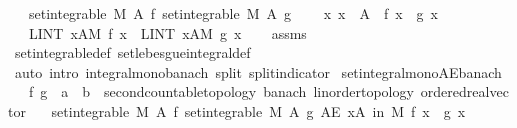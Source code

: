 \begin{isabellebody}
\ \ \ {\isachardoublequoteopen}set{\isacharunderscore}{\kern0pt}integrable\ M\ A\ f{\isachardoublequoteclose}\ {\isachardoublequoteopen}set{\isacharunderscore}{\kern0pt}integrable\ M\ A\ g{\isachardoublequoteclose}\isanewline
\ \ \ \ {\isachardoublequoteopen}{\isasymAnd}x{\isachardot}{\kern0pt}\ x\ {\isasymin}\ A\ {\isasymLongrightarrow}\ f\ x\ {\isasymle}\ g\ x{\isachardoublequoteclose}\isanewline
\ \ \ {\isachardoublequoteopen}{\isacharparenleft}{\kern0pt}LINT\ x{\isacharcolon}{\kern0pt}A{\isacharbar}{\kern0pt}M{\isachardot}{\kern0pt}\ f\ x{\isacharparenright}{\kern0pt}\ {\isasymle}\ {\isacharparenleft}{\kern0pt}LINT\ x{\isacharcolon}{\kern0pt}A{\isacharbar}{\kern0pt}M{\isachardot}{\kern0pt}\ g\ x{\isacharparenright}{\kern0pt}{\isachardoublequoteclose}\isanewline
%
\isadelimproof
\ \ %
\endisadelimproof
%
\isatagproof
{}\isamarkupfalse%
\ assms\ \isamarkupfalse%
\ set{\isacharunderscore}{\kern0pt}integrable{\isacharunderscore}{\kern0pt}def\ set{\isacharunderscore}{\kern0pt}lebesgue{\isacharunderscore}{\kern0pt}integral{\isacharunderscore}{\kern0pt}def\isanewline
\ \ \isamarkupfalse%
\ {\isacharparenleft}{\kern0pt}auto\ intro{\isacharcolon}{\kern0pt}\ integral{\isacharunderscore}{\kern0pt}mono{\isacharunderscore}{\kern0pt}banach\ split{\isacharcolon}{\kern0pt}\ split{\isacharunderscore}{\kern0pt}indicator{\isacharparenright}{\kern0pt}%
\endisatagproof
{\isafoldproof}%
%
\isadelimproof
\isanewline
%
\endisadelimproof
\isanewline
{}\isamarkupfalse%
\ set{\isacharunderscore}{\kern0pt}integral{\isacharunderscore}{\kern0pt}mono{\isacharunderscore}{\kern0pt}AE{\isacharunderscore}{\kern0pt}banach{\isacharcolon}{\kern0pt}\isanewline
\ \ \ f\ g\ {\isacharcolon}{\kern0pt}{\isacharcolon}{\kern0pt}\ {\isachardoublequoteopen}{\isacharprime}{\kern0pt}a\ {\isasymRightarrow}\ {\isacharprime}{\kern0pt}b\ {\isacharcolon}{\kern0pt}{\isacharcolon}{\kern0pt}\ {\isacharbraceleft}{\kern0pt}second{\isacharunderscore}{\kern0pt}countable{\isacharunderscore}{\kern0pt}topology{\isacharcomma}{\kern0pt}\ banach{\isacharcomma}{\kern0pt}\ linorder{\isacharunderscore}{\kern0pt}topology{\isacharcomma}{\kern0pt}\ ordered{\isacharunderscore}{\kern0pt}real{\isacharunderscore}{\kern0pt}vector{\isacharbraceright}{\kern0pt}{\isachardoublequoteclose}\isanewline
\ \ \ {\isachardoublequoteopen}set{\isacharunderscore}{\kern0pt}integrable\ M\ A\ f{\isachardoublequoteclose}\ {\isachardoublequoteopen}set{\isacharunderscore}{\kern0pt}integrable\ M\ A\ g{\isachardoublequoteclose}\ {\isachardoublequoteopen}AE\ x{\isasymin}A\ in\ M{\isachardot}{\kern0pt}\ f\ x\ {\isasymle}\ g\ x{\isachardoublequoteclose}\isanewline

\end{isabellebody}
